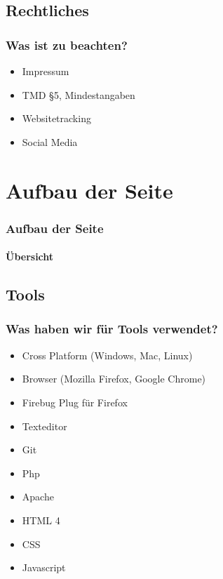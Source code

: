 \documentclass[xcolor=dvipsnames]{beamer}
\begin{document}
\subsection{Rechtliches}
\begin{frame} %
  \frametitle{Was ist zu beachten?} %
  \begin{block}{}
	\begin{itemize}
		\item Impressum
		\item TMD §5, Mindestangaben
		\item Websitetracking
		\item Social Media
	\end{itemize}
  \end{block}
\end{frame}


\section{Aufbau der Seite}
\begin{frame} %
  \frametitle{Aufbau der Seite} %
  \framesubtitle{Übersicht} %
\end{frame}


\subsection{Tools}
\begin{frame} %
  \frametitle{Was haben wir für Tools verwendet?} %
  \begin{block}{}
	  \begin{itemize}
		\item Cross Platform (Windows, Mac, Linux)
		\item Browser (Mozilla Firefox, Google Chrome)  	
		\item Firebug Plug für Firefox
  		\item Texteditor
	  	\item Git
		\item Php
		\item Apache
		\item HTML 4
		\item CSS
		\item Javascript
	  \end{itemize}
  \end{block}
\end{frame}
\end{document}
